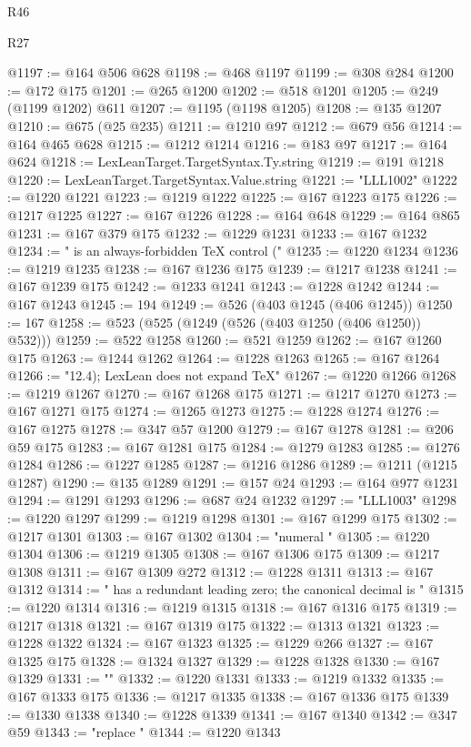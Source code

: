 \begin{lexlean}{R46}
\begin{lexlean}{R27}
\begin{coremodule}
{{{{{{{{{{{{{{{{{{{{{{{{{{{{{{{{{{{{{{{{{{{{{{{{{{{{{{{{{{{{{{@1197 := @164 @506 @628
@1198 := @468 @1197
@1199 := @308 @284
@1200 := @172 @175
@1201 := @265 @1200
@1202 := @518 @1201
@1205 := @249 (@1199 @1202) @611
@1207 := @1195 (@1198 @1205)
@1208 := @135 @1207
@1210 := @675 (@25 @235)
@1211 := @1210 @97
@1212 := @679 @56
@1214 := @164 @465 @628
@1215 := @1212 @1214
@1216 := @183 @97
@1217 := @164 @624
@1218 := LexLeanTarget.TargetSyntax.Ty.string
@1219 := @191 @1218
@1220 := LexLeanTarget.TargetSyntax.Value.string
@1221 := "LLL1002"
@1222 := @1220 @1221
@1223 := @1219 @1222
@1225 := @167 @1223 @175
@1226 := @1217 @1225
@1227 := @167 @1226
@1228 := @164 @648
@1229 := @164 @865
@1231 := @167 @379 @175
@1232 := @1229 @1231
@1233 := @167 @1232
@1234 := " is an always-forbidden TeX control ("
@1235 := @1220 @1234
@1236 := @1219 @1235
@1238 := @167 @1236 @175
@1239 := @1217 @1238
@1241 := @167 @1239 @175
@1242 := @1233 @1241
@1243 := @1228 @1242
@1244 := @167 @1243
@1245 := 194
@1249 := @526 (@403 @1245 (@406 @1245))
@1250 := 167
@1258 := @523 (@525 (@1249 (@526 (@403 @1250 (@406 @1250)) @532)))
@1259 := @522 @1258
@1260 := @521 @1259
@1262 := @167 @1260 @175
@1263 := @1244 @1262
@1264 := @1228 @1263
@1265 := @167 @1264
@1266 := "12.4); LexLean does not expand TeX"
@1267 := @1220 @1266
@1268 := @1219 @1267
@1270 := @167 @1268 @175
@1271 := @1217 @1270
@1273 := @167 @1271 @175
@1274 := @1265 @1273
@1275 := @1228 @1274
@1276 := @167 @1275
@1278 := @347 @57 @1200
@1279 := @167 @1278
@1281 := @206 @59 @175
@1283 := @167 @1281 @175
@1284 := @1279 @1283
@1285 := @1276 @1284
@1286 := @1227 @1285
@1287 := @1216 @1286
@1289 := @1211 (@1215 @1287)
@1290 := @135 @1289
@1291 := @157 @24
@1293 := @164 @977 @1231
@1294 := @1291 @1293
@1296 := @687 @24 @1232
@1297 := "LLL1003"
@1298 := @1220 @1297
@1299 := @1219 @1298
@1301 := @167 @1299 @175
@1302 := @1217 @1301
@1303 := @167 @1302
@1304 := "numeral "
@1305 := @1220 @1304
@1306 := @1219 @1305
@1308 := @167 @1306 @175
@1309 := @1217 @1308
@1311 := @167 @1309 @272
@1312 := @1228 @1311
@1313 := @167 @1312
@1314 := " has a redundant leading zero; the canonical decimal is "
@1315 := @1220 @1314
@1316 := @1219 @1315
@1318 := @167 @1316 @175
@1319 := @1217 @1318
@1321 := @167 @1319 @175
@1322 := @1313 @1321
@1323 := @1228 @1322
@1324 := @167 @1323
@1325 := @1229 @266
@1327 := @167 @1325 @175
@1328 := @1324 @1327
@1329 := @1228 @1328
@1330 := @167 @1329
@1331 := ""
@1332 := @1220 @1331
@1333 := @1219 @1332
@1335 := @167 @1333 @175
@1336 := @1217 @1335
@1338 := @167 @1336 @175
@1339 := @1330 @1338
@1340 := @1228 @1339
@1341 := @167 @1340
@1342 := @347 @59
@1343 := "replace "
@1344 := @1220 @1343
}}}}}}}}}}}}}}}}}}}}}}}}}}}}}}}}}}}}}}}}}}}}}}}}}}}}}}}}}}}}}}
\end{coremodule}
\end{lexlean}
\end{lexlean}
